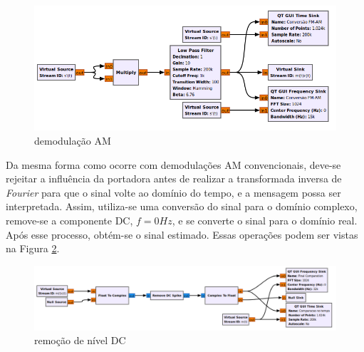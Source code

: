 \begin{figure}[!htb]
    \centering
    \includegraphics[width=1\linewidth]{Imagens/fig:dem_02.png}
    \caption{demodulação AM}
    \label{demod_02}
\end{figure}

Da mesma forma como ocorre com demodulações AM convencionais, deve-se rejeitar a influência da portadora antes de realizar a transformada inversa de \textit{Fourier} para que o sinal volte ao domínio do tempo, e a mensagem possa ser interpretada. Assim, utiliza-se uma conversão do sinal para o domínio complexo, remove-se a componente DC, $f = 0Hz$, e se converte o sinal para o domínio real. Após esse processo, obtém-se o sinal estimado. Essas operações podem ser vistas na Figura \ref{fig03}.

\begin{figure}[!htb]
    \centering
    \includegraphics[width=1\linewidth]{Imagens/fig:dem_03.png}
    \caption{remoção de nível DC}
    \label{fig03}
\end{figure}